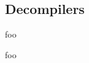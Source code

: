 
\subsection{Decompilers}
\label{sec:rel_work_decompilers}


foo


foo \cite{retargetable_decomp}




